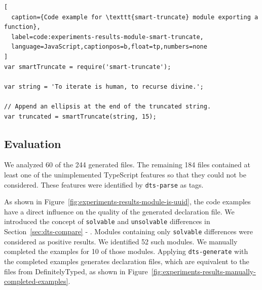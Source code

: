 \documentclass[english,cleveref,autoref,submission]{programming}
\newcommand{\secref}[1]{Section~\ref{#1} - \nameref{#1}}
\newcommand{\figref}[1]{Figure~\ref{#1}}
\begin{document}
\begin{lstlisting}[
  caption={Code example for \texttt{smart-truncate} module exporting a function},
  label=code:experiments-results-module-smart-truncate,
  language=JavaScript,captionpos=b,float=tp,numbers=none
]
var smartTruncate = require('smart-truncate');

var string = 'To iterate is human, to recurse divine.';

// Append an ellipsis at the end of the truncated string.
var truncated = smartTruncate(string, 15);
\end{lstlisting}

\subsection{Evaluation}
\label{sec:experiments-evaluation}
We analyzed 60 of the 244 generated files. The remaining 184 files contained at least one
of the unimplemented TypeScript features so that they could not be considered. These
features were identified by \texttt{dts-parse} as tags.


As shown in \figref{fig:experiments-results-module-is-uuid}, the code examples have a
direct influence on the quality of the generated declaration file. We introduced the
concept of \texttt{solvable} and \texttt{unsolvable} differences in
\secref{sec:dts-compare}. Modules containing only \texttt{solvable} differences were
considered as positive results. We identified 52 such modules. We manually completed the
examples for 10 of those modules. Applying \texttt{dts-generate} with the completed
examples generates declaration files, which are equivalent to the files from DefinitelyTyped, as
shown in \figref{fig:experiments-results-manually-completed-examples}.
\end{document}
